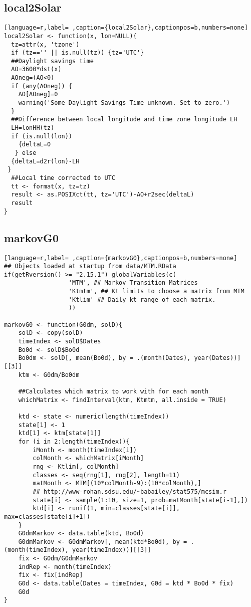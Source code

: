 \subsection{local2Solar}
\label{sec:org3c80fc7}
\label{subsec:local2solar}
\begin{lstlisting}[language=r,label= ,caption={local2Solar},captionpos=b,numbers=none]
local2Solar <- function(x, lon=NULL){	
  tz=attr(x, 'tzone')
  if (tz=='' || is.null(tz)) {tz='UTC'}
  ##Daylight savings time
  AO=3600*dst(x)
  AOneg=(AO<0)
  if (any(AOneg)) {
    AO[AOneg]=0
    warning('Some Daylight Savings Time unknown. Set to zero.')
  }
  ##Difference between local longitude and time zone longitude LH
  LH=lonHH(tz)
  if (is.null(lon)) 
    {deltaL=0
   } else
  {deltaL=d2r(lon)-LH
 }
  ##Local time corrected to UTC
  tt <- format(x, tz=tz)
  result <- as.POSIXct(tt, tz='UTC')-AO+r2sec(deltaL)
  result
}
\end{lstlisting}
\subsection{markovG0}
\label{sec:orgdee8138}
\label{subsec:markovg0}
\begin{lstlisting}[language=r,label= ,caption={markovG0},captionpos=b,numbers=none]
## Objects loaded at startup from data/MTM.RData
if(getRversion() >= "2.15.1") globalVariables(c(
                  'MTM', ## Markov Transition Matrices
                  'Ktmtm', ## Kt limits to choose a matrix from MTM
                  'Ktlim' ## Daily kt range of each matrix.
                  ))

markovG0 <- function(G0dm, solD){
    solD <- copy(solD)
    timeIndex <- solD$Dates
    Bo0d <- solD$Bo0d
    Bo0dm <- solD[, mean(Bo0d), by = .(month(Dates), year(Dates))][[3]]
    ktm <- G0dm/Bo0dm

    ##Calculates which matrix to work with for each month
    whichMatrix <- findInterval(ktm, Ktmtm, all.inside = TRUE)

    ktd <- state <- numeric(length(timeIndex))
    state[1] <- 1
    ktd[1] <- ktm[state[1]]
    for (i in 2:length(timeIndex)){
        iMonth <- month(timeIndex[i])
        colMonth <- whichMatrix[iMonth]
        rng <- Ktlim[, colMonth]
        classes <- seq(rng[1], rng[2], length=11)
        matMonth <- MTM[(10*colMonth-9):(10*colMonth),]
        ## http://www-rohan.sdsu.edu/~babailey/stat575/mcsim.r
        state[i] <- sample(1:10, size=1, prob=matMonth[state[i-1],])
        ktd[i] <- runif(1, min=classes[state[i]], max=classes[state[i]+1])
    }
    G0dmMarkov <- data.table(ktd, Bo0d)
    G0dmMarkov <- G0dmMarkov[, mean(ktd*Bo0d), by = .(month(timeIndex), year(timeIndex))][[3]]
    fix <- G0dm/G0dmMarkov
    indRep <- month(timeIndex)
    fix <- fix[indRep]
    G0d <- data.table(Dates = timeIndex, G0d = ktd * Bo0d * fix)
    G0d
}
\end{lstlisting}
